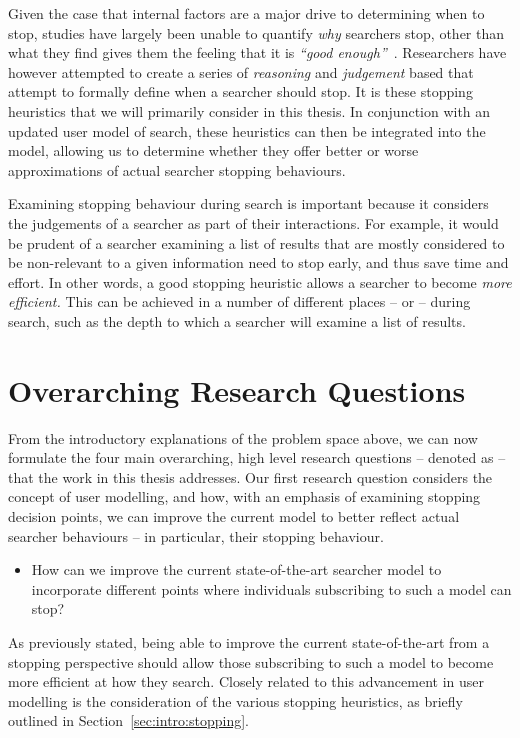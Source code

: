 Given the case that internal factors are a major drive to determining when to stop, studies have largely been unable to quantify \emph{why} searchers stop, other than what they find gives them the feeling that it is \emph{``good enough''}~\citep{zach2005enough_is_enough}. Researchers have however attempted to create a series of \emph{reasoning} and \emph{judgement} based  that attempt to formally define when a searcher should stop. It is these stopping heuristics that we will primarily consider in this thesis. In conjunction with an updated user model of search, these heuristics can then be integrated into the model, allowing us to determine whether they offer better or worse approximations of actual searcher stopping behaviours.

Examining stopping behaviour during search is important because it considers the judgements of a searcher as part of their interactions. For example, it would be prudent of a searcher examining a list of results that are mostly considered to be non-relevant to a given information need to stop early, and thus save time and effort. In other words, a good stopping heuristic allows a searcher to become \emph{more efficient.} This can be achieved in a number of different places -- or  -- during search, such as the depth to which a searcher will examine a list of results.

\section{Overarching Research Questions}\label{sec:intro:rqs}
From the introductory explanations of the problem space above, we can now formulate the four main overarching, high level research questions -- denoted as  -- that the work in this thesis addresses. Our first research question considers the concept of user modelling, and how, with an emphasis of examining stopping decision points, we can improve the current model to better reflect actual searcher behaviours -- in particular, their stopping behaviour.

\begin{itemize}
    \item[]{ How can we improve the current state-of-the-art searcher model to incorporate different points where individuals subscribing to such a model can stop?}
\end{itemize}

As previously stated, being able to improve the current state-of-the-art from a stopping perspective should allow those subscribing to such a model to become more efficient at how they search. Closely related to this advancement in user modelling is the consideration of the various stopping heuristics, as briefly outlined in Section~\ref{sec:intro:stopping}.

